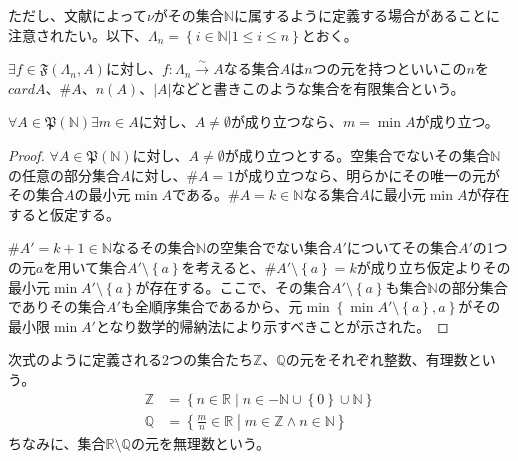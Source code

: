 \documentclass[dvipdfmx]{jsarticle}
\begin{document}
ただし、文献によって$\nu$がその集合$\mathbb{N}$に属するように定義する場合があることに注意されたい。以下、$\varLambda_{n} = \left\{ i \in \mathbb{N}|1 \leq i \leq n \right\}$とおく。
\begin{dfn}
$\exists f \in \mathfrak{F}\left( \varLambda_{n},A \right)$に対し、$f:\varLambda_{n}\overset{\sim}{\rightarrow}A$なる集合$A$は$n$つの元を持つといいこの$n$を$cardA$、$\# A$、$n(A)$、$|A|$などと書きこのような集合を有限集合という。
\end{dfn}
\begin{thm}\label{4.1.1.21}
$\forall A \in \mathfrak{P}\left( \mathbb{N} \right)\exists m \in A$に対し、$A \neq \emptyset$が成り立つなら、$m = \min A$が成り立つ。
\end{thm}
\begin{proof}
$\forall A \in \mathfrak{P}\left( \mathbb{N} \right)$に対し、$A \neq \emptyset$が成り立つとする。空集合でないその集合$\mathbb{N}$の任意の部分集合$A$に対し、$\#A = 1$が成り立つなら、明らかにその唯一の元がその集合$A$の最小元$\min A$である。$\#A = k \in \mathbb{N}$なる集合$A$に最小元$\min A$が存在すると仮定する。\par
$\#A' = k + 1 \in \mathbb{N}$なるその集合$\mathbb{N}$の空集合でない集合$A'$についてその集合$A'$の1つの元$a$を用いて集合$A' \setminus \left\{ a \right\}$を考えると、$\#{A' \setminus \left\{ a \right\}} = k$が成り立ち仮定よりその最小元$\min{A' \setminus \left\{ a \right\}}$が存在する。ここで、その集合$A' \setminus \left\{ a \right\}$も集合$\mathbb{N}$の部分集合でありその集合$A'$も全順序集合であるから、元$\min\left\{ \min{A' \setminus \left\{ a \right\}},a \right\}$がその最小限$\min A'$となり数学的帰納法により示すべきことが示された。
\end{proof}
\begin{dfn}
次式のように定義される2つの集合たち$\mathbb{Z}$、$\mathbb{Q}$の元をそれぞれ整数、有理数という。
\begin{align*}
\mathbb{Z} &= \left\{ n \in \mathbb{R} \middle| n \in - \mathbb{N} \cup \left\{ 0 \right\} \cup \mathbb{N} \right\}\\ 
\mathbb{Q} &= \left\{ \frac{m}{n} \in \mathbb{R} \middle| m \in \mathbb{Z} \land n \in \mathbb{N} \right\}
\end{align*}
ちなみに、集合$\mathbb{R} \setminus \mathbb{Q}$の元を無理数という。
\end{dfn}
\end{document}

